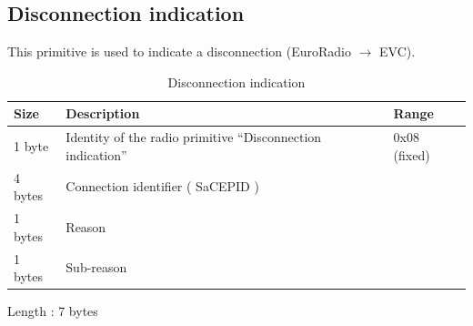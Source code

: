 \documentclass[nocc]{template/openetcs_report}
\begin{document}
\subsection{Disconnection indication}
This primitive is used to indicate a disconnection (EuroRadio $\rightarrow$ EVC).
 			\begin{longtable}{|l|l|l|}
				\caption{Disconnection indication}\\ 
				\hline
				
					\begin{minipage}[t]{0.1\linewidth} \textbf{Size}	\end{minipage}
				&	\begin{minipage}[t]{0.5\linewidth} \textbf{Description}	\end{minipage}
				&	\begin{minipage}[t]{0.3\linewidth} \textbf{Range} \end{minipage} \\
				
				\hline
					 \begin{minipage}[t]{0.1\linewidth}1 byte \end{minipage}
					&\begin{minipage}[t]{0.6\linewidth}Identity of the radio primitive "`Disconnection indication"'	\end{minipage}
					&\begin{minipage}[t]{0.3\linewidth}0x08 (fixed) \end{minipage} \\
					
				\hline
					 \begin{minipage}[t]{0.1\linewidth}4 bytes \end{minipage}
					&\begin{minipage}[t]{0.6\linewidth}Connection identifier ( SaCEPID )	\end{minipage}
					&\begin{minipage}[t]{0.3\linewidth} \end{minipage} \\
					
				\hline
						\begin{minipage}[t]{0.1\linewidth}1 bytes \end{minipage}
					&\begin{minipage}[t]{0.6\linewidth}Reason \end{minipage}
					&\begin{minipage}[t]{0.3\linewidth} \end{minipage} \\
					
				\hline
						\begin{minipage}[t]{0.1\linewidth}1 bytes \end{minipage}
					&\begin{minipage}[t]{0.6\linewidth}Sub-reason \end{minipage}
					&\begin{minipage}[t]{0.3\linewidth} \end{minipage} \\
					
				\hline
			\end{longtable}
			Length : 7 bytes

\end{document}

